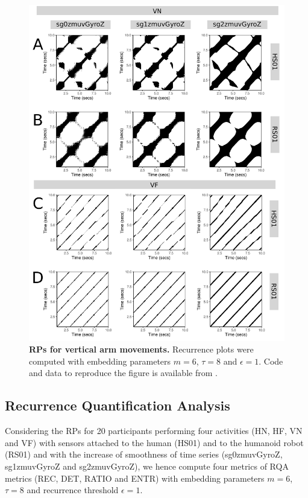 \documentclass[fleqn,10pt]{wlscirep}
\begin{document}
\begin{figure}[ht]
\centering
\includegraphics[width=1.0\textwidth]{figures/rps/pdf/rp_aV}
\caption{
	{\bf RPs for vertical arm movements.}	
	Recurrence plots were computed with 
	embedding parameters $m=6$, $\tau=8$ and $\epsilon=1$.
	Code and data to reproduce the figure is available from \cite{srep2019}.
        }
    \label{fig:rp_aV}
\end{figure}






\subsection*{Recurrence Quantification Analysis} \label{ch6:rqas}
Considering the RPs for 20 participants performing four activities 
(HN, HF, VN and VF) with sensors attached to the human (HS01) and to the 
humanoid robot (RS01) and with the increase of smoothness of time series 
(sg0zmuvGyroZ, sg1zmuvGyroZ and sg2zmuvGyroZ), 
we hence compute four metrics of RQA metrics (REC, DET, RATIO and ENTR) with 
embedding parameters $m=6$, $\tau=8$ and recurrence threshold $\epsilon=1$.
 
\end{document}

